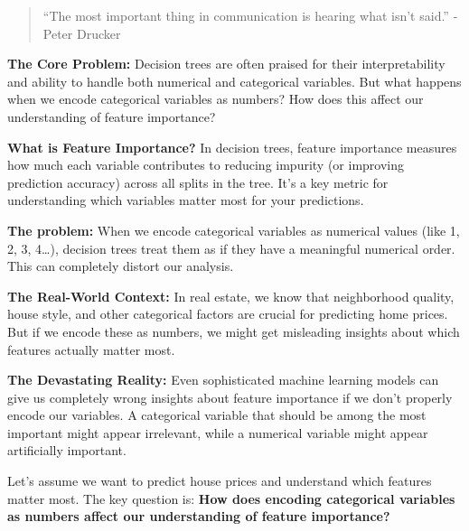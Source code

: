 \documentclass[
  letterpaper,
  DIV=11,
  numbers=noendperiod]{scrartcl}
\begin{document}
\begin{quote}
``The most important thing in communication is hearing what isn't
said.'' - Peter Drucker
\end{quote}

\textbf{The Core Problem:} Decision trees are often praised for their
interpretability and ability to handle both numerical and categorical
variables. But what happens when we encode categorical variables as
numbers? How does this affect our understanding of feature importance?

\textbf{What is Feature Importance?} In decision trees, feature
importance measures how much each variable contributes to reducing
impurity (or improving prediction accuracy) across all splits in the
tree. It's a key metric for understanding which variables matter most
for your predictions.

\begin{tcolorbox}[enhanced jigsaw, coltitle=black, colframe=quarto-callout-important-color-frame, bottomtitle=1mm, colbacktitle=quarto-callout-important-color!10!white, breakable, title=\textcolor{quarto-callout-important-color}{\faExclamation}\hspace{0.5em}{🎯 The Key Insight: Encoding Matters for Interpretability}, rightrule=.15mm, colback=white, titlerule=0mm, arc=.35mm, left=2mm, opacitybacktitle=0.6, leftrule=.75mm, toptitle=1mm, bottomrule=.15mm, toprule=.15mm, opacityback=0]

\textbf{The problem:} When we encode categorical variables as numerical
values (like 1, 2, 3, 4\ldots), decision trees treat them as if they
have a meaningful numerical order. This can completely distort our
analysis.

\textbf{The Real-World Context:} In real estate, we know that
neighborhood quality, house style, and other categorical factors are
crucial for predicting home prices. But if we encode these as numbers,
we might get misleading insights about which features actually matter
most.

\textbf{The Devastating Reality:} Even sophisticated machine learning
models can give us completely wrong insights about feature importance if
we don't properly encode our variables. A categorical variable that
should be among the most important might appear irrelevant, while a
numerical variable might appear artificially important.

\end{tcolorbox}

Let's assume we want to predict house prices and understand which
features matter most. The key question is: \textbf{How does encoding
categorical variables as numbers affect our understanding of feature
importance?}
\end{document}
